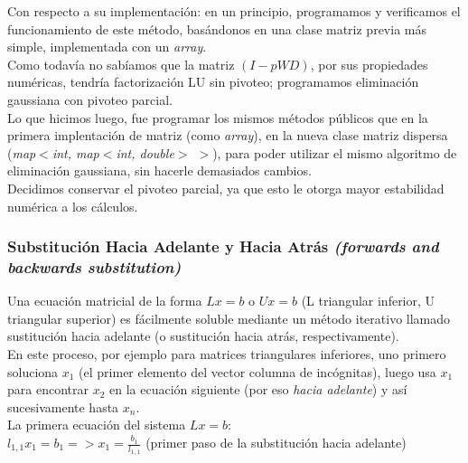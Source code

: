 
				Con respecto a su implementación: en un principio, programamos y verificamos el funcionamiento de este método, basándonos en una clase matriz previa más simple, implementada con un \textit{array}. \\

				Como todavía no sabíamos que la matriz $(I-pWD)$, por sus propiedades numéricas, tendría factorización LU sin pivoteo; programamos eliminación gaussiana con pivoteo parcial. \\ %

				Lo que hicimos luego, fue programar los mismos métodos públicos que en la primera implentación de matriz (como \textit{array}), en la nueva clase matriz dispersa (\textit{map$<$int, map$<$int, double$>$ $>$}), para poder utilizar el mismo algoritmo de eliminación gaussiana, sin hacerle demasiados cambios. \\

				Decidimos conservar el pivoteo parcial, ya que esto le otorga mayor estabilidad numérica a los cálculos. \\ %

		\subsubsection{Substitución Hacia Adelante y Hacia Atrás \textit{(forwards and backwards substitution)}}

			Una ecuación matricial de la forma $Lx = b$ o $Ux = b$ (L triangular inferior, U triangular superior) es fácilmente soluble mediante un método iterativo llamado sustitución hacia adelante (o sustitución hacia atrás, respectivamente). \\

			En este proceso, por ejemplo para matrices triangulares inferiores, uno primero soluciona $x_1$ (el primer elemento del vector columna de incógnitas), luego usa $x_1$ para encontrar $x_2$ en la ecuación siguiente (por eso \textit{hacia adelante}) y así sucesivamente hasta $x_n$. \\

			La primera ecuación del sistema $Lx = b$: \\

			$l_{1,1} x_{1} = b_{1} => x_{1} = \frac{b_{1}}{l_{1,1}}$ \qquad (primer paso de la substitución hacia adelante) \\

